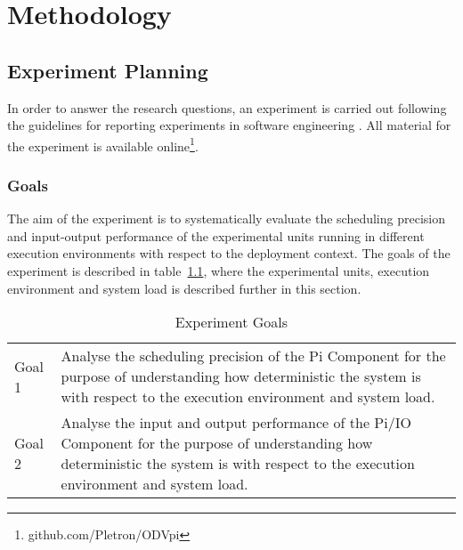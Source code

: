 \iffalse  \fi
\chapter{Methodology}

\section{Experiment Planning}
In order to answer the research questions, an experiment is carried out following the guidelines for reporting experiments in software engineering \cite{Andreas}. All material for the experiment is available online\footnote{github.com/Pletron/ODVpi}. 


\subsection{Goals}
The aim of the experiment is to systematically evaluate the scheduling precision and input-output performance of the experimental units running in different execution environments with respect to the deployment context. The goals of the experiment is described in table~\ref{table:exp-goals}, where the experimental units, execution environment and system load is described further in this section.  


\begin{table}[ht]
\begin{tabular}{l|p{12cm}}
Goal 1 & Analyse the scheduling precision of the Pi Component for the purpose of understanding how deterministic the system is with respect to the execution environment and system load. \\
Goal 2 & Analyse the input and output performance of the Pi/IO Component for the purpose of understanding how deterministic the system is with respect to the execution environment and system load.
\end{tabular}
\centering
\caption{Experiment Goals}
\label{table:exp-goals}
\end{table}


